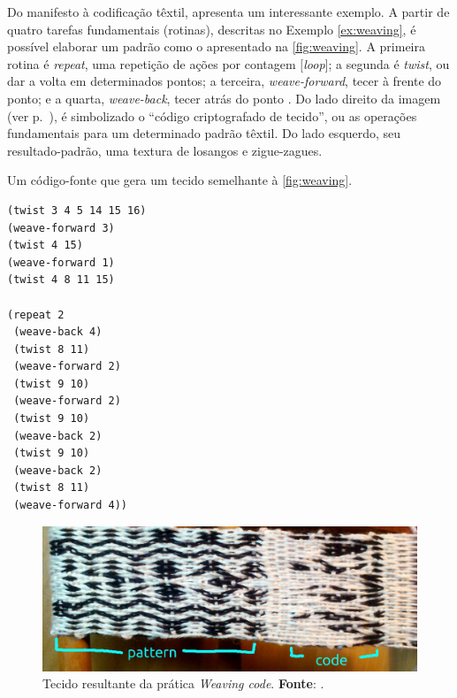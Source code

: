 Do manifesto à codificação têxtil,  apresenta um interessante exemplo. A partir de quatro tarefas fundamentais (rotinas), descritas no Exemplo \autoref{ex:weaving}, é possível elaborar um padrão como o apresentado na \autoref{fig:weaving}. A primeira rotina é \emph{repeat}, uma repetição de ações por contagem $[$\emph{loop}$]$; a segunda é \emph{twist}, ou dar a volta em determinados pontos; a terceira,  \emph{weave-forward}, tecer à frente do ponto; e a quarta, \emph{weave-back}, tecer atrás do ponto . Do lado direito da imagem (ver p.~\pageref{fig:weaving}), é simbolizado o ``código criptografado de tecido'', ou as operações fundamentais para um determinado padrão têxtil. Do lado esquerdo, seu resultado-padrão, uma textura de losangos e zigue-zagues.  

\begin{example}{Um código-fonte que gera um tecido semelhante à \autoref{fig:weaving}.}
\label{ex:weaving}
\begin{verbatim}
(twist 3 4 5 14 15 16)
(weave-forward 3)
(twist 4 15)
(weave-forward 1)
(twist 4 8 11 15)

(repeat 2
 (weave-back 4)
 (twist 8 11)
 (weave-forward 2)
 (twist 9 10)
 (weave-forward 2)
 (twist 9 10)
 (weave-back 2)
 (twist 9 10)
 (weave-back 2)
 (twist 8 11)
 (weave-forward 4))
\end{verbatim}
\end{example}

\begin{figure}[!h]
    \centering
    \includegraphics[scale=0.31]{imagens/weaving.jpg}
    \caption{Tecido resultante da prática \emph{Weaving code}. \textbf{Fonte}: .}
  \label{fig:weaving}
\end{figure}



